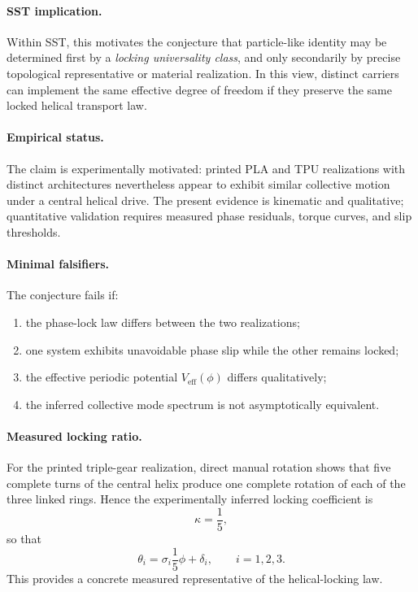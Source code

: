 \documentclass[11pt]{article}
\begin{document}
            \paragraph{SST implication.}
                Within SST, this motivates the conjecture that particle-like identity may be determined first by a \emph{locking universality class}, and only secondarily by precise topological representative or material realization. In this view, distinct carriers can implement the same effective degree of freedom if they preserve the same locked helical transport law.
            
            \paragraph{Empirical status.}
                The claim is experimentally motivated: printed PLA and TPU realizations with distinct architectures nevertheless appear to exhibit similar collective motion under a central helical drive. The present evidence is kinematic and qualitative; quantitative validation requires measured phase residuals, torque curves, and slip thresholds.
            
            \paragraph{Minimal falsifiers.}
                The conjecture fails if:
            \begin{enumerate}
                \item the phase-lock law differs between the two realizations;
                \item one system exhibits unavoidable phase slip while the other remains locked;
                \item the effective periodic potential \(V_{\mathrm{eff}}(\phi)\) differs qualitatively;
                \item the inferred collective mode spectrum is not asymptotically equivalent.
                \end{enumerate}
            
            \paragraph{Measured locking ratio.}
                For the printed triple-gear realization, direct manual rotation shows that five complete turns of the central helix produce one complete rotation of each of the three linked rings. Hence the experimentally inferred locking coefficient is
            \begin{equation}
                \kappa = \frac{1}{5},
                \end{equation}
                so that
            \begin{equation}
                \theta_i = \sigma_i \frac{1}{5}\phi + \delta_i,
                \qquad i=1,2,3.
                \end{equation}
                This provides a concrete measured representative of the helical-locking law.
    
\end{document}
